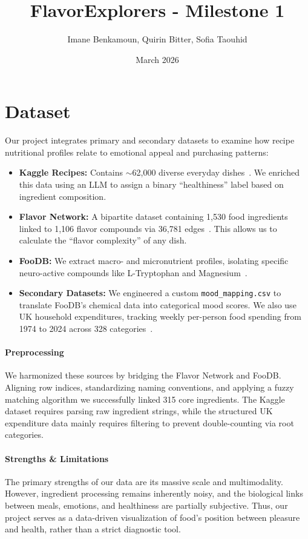 \documentclass{article}
\title{FlavorExplorers - Milestone 1}
\author{Imane Benkamoun, Quirin Bitter, Sofia Taouhid}
\date{March 2026}
\begin{document}
\maketitle

\section{Dataset}
Our project integrates primary and secondary datasets to examine how recipe nutritional profiles relate to emotional appeal and purchasing patterns:

\begin{itemize}
    \item \textbf{Kaggle Recipes:} Contains $\sim$62,000 diverse everyday dishes~\cite{singh25}. We enriched this data using an LLM to assign a binary \enquote{healthiness} label based on ingredient composition.
    \item \textbf{Flavor Network:} A bipartite dataset containing 1,530 food ingredients linked to 1,106 flavor compounds via 36,781 edges~\cite{cheng16}. This allows us to calculate the \enquote{flavor complexity} of any dish.
    \item \textbf{FooDB:} We extract macro- and micronutrient profiles, isolating specific neuro-active compounds like L-Tryptophan and Magnesium~\cite{foodb26}.
    \item \textbf{Secondary Datasets:} We engineered a custom \texttt{mood\_mapping.csv} to translate FooDB's chemical data into categorical mood scores. We also use UK household expenditures, tracking weekly per-person food spending from 1974 to 2024 across 328 categories~\cite{uk-expenditure-24, uk-population-25}.
\end{itemize}

\paragraph{Preprocessing}
We harmonized these sources by bridging the Flavor Network and FooDB. Aligning row indices, standardizing naming conventions, and applying a fuzzy matching algorithm we successfully linked 315 core ingredients. The Kaggle dataset requires parsing raw ingredient strings, while the structured UK expenditure data mainly requires filtering to prevent double-counting via root categories.

\paragraph{Strengths \& Limitations}
The primary strengths of our data are its massive scale and multimodality. However, ingredient processing remains inherently noisy, and the biological links between meals, emotions, and healthiness are partially subjective. Thus, our project serves as a data-driven visualization of food's position between pleasure and health, rather than a strict diagnostic tool.
\end{document}
